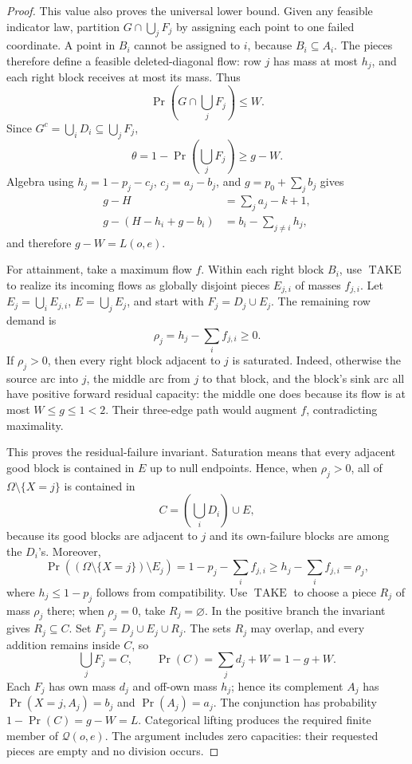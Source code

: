 \documentclass{article}
\begin{document}
\begin{proof}
This value also proves the universal lower bound.  Given any feasible indicator law, partition \(G\cap\bigcup_jF_j\) by assigning each point to one failed coordinate.  A point in \(B_i\) cannot be assigned to \(i\), because \(B_i\subseteq A_i\).  The pieces therefore define a feasible deleted-diagonal flow: row \(j\) has mass at most \(h_j\), and each right block receives at most its mass.  Thus
\[
 \Pr\left(G\cap\bigcup_jF_j\right)\leq W.
\]
Since \(G^c=\bigcup_iD_i\subseteq\bigcup_jF_j\),
\[
 \theta=1-\Pr\left(\bigcup_jF_j\right)\geq g-W.
\]
Algebra using \(h_j=1-p_j-c_j\), \(c_j=a_j-b_j\), and \(g=p_0+\sum_jb_j\) gives
\[
 \begin{aligned}
 g-H&=\sum_ja_j-k+1,\\
 g-(H-h_i+g-b_i)&=b_i-\sum_{j\ne i}h_j,
 \end{aligned}
\]
and therefore \(g-W=L(o,e)\).

For attainment, take a maximum flow \(f\).  Within each right block \(B_i\), use \(\operatorname{TAKE}\) to realize its incoming flows as globally disjoint pieces \(E_{j,i}\) of masses \(f_{j,i}\).  Let \(E_j=\bigcup_iE_{j,i}\), \(E=\bigcup_jE_j\), and start with \(F_j=D_j\cup E_j\).  The remaining row demand is
\[
 \rho_j=h_j-\sum_i f_{j,i}\geq0.
\]
If \(\rho_j>0\), then every right block adjacent to \(j\) is saturated.  Indeed, otherwise the source arc into \(j\), the middle arc from \(j\) to that block, and the block's sink arc all have positive forward residual capacity: the middle one does because its flow is at most \(W\leq g\leq1<2\).  Their three-edge path would augment \(f\), contradicting maximality.

This proves the residual-failure invariant.  Saturation means that every adjacent good block is contained in \(E\) up to null endpoints.  Hence, when \(\rho_j>0\), all of \(\Omega\setminus\{X=j\}\) is contained in
\[
 C=\left(\bigcup_iD_i\right)\cup E,
\]
because its good blocks are adjacent to \(j\) and its own-failure blocks are among the \(D_i\)'s.  Moreover,
\[
 \Pr((\Omega\setminus\{X=j\})\setminus E_j)
 =1-p_j-\sum_i f_{j,i}
 \geq h_j-\sum_i f_{j,i}=\rho_j,
\]
where \(h_j\leq1-p_j\) follows from compatibility.  Use \(\operatorname{TAKE}\) to choose a piece \(R_j\) of mass \(\rho_j\) there; when \(\rho_j=0\), take \(R_j=\varnothing\).  In the positive branch the invariant gives \(R_j\subseteq C\).  Set \(F_j=D_j\cup E_j\cup R_j\).  The sets \(R_j\) may overlap, and every addition remains inside \(C\), so
\[
 \bigcup_jF_j=C,
 \qquad \Pr(C)=\sum_jd_j+W=1-g+W.
\]
Each \(F_j\) has own mass \(d_j\) and off-own mass \(h_j\); hence its complement \(A_j\) has \(\Pr(X=j,A_j)=b_j\) and \(\Pr(A_j)=a_j\).  The conjunction has probability \(1-\Pr(C)=g-W=L\).  Categorical lifting produces the required finite member of \(\mathcal Q(o,e)\).  The argument includes zero capacities: their requested pieces are empty and no division occurs.
\end{proof}
\end{document}
